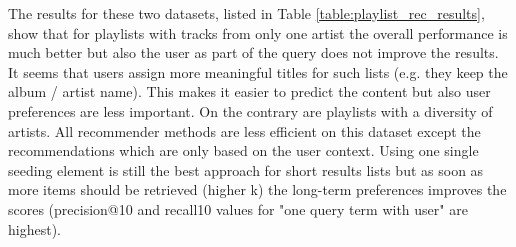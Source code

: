 \documentclass[sigconf]{acmart}
\begin{document}
The results for these two datasets, listed in Table \ref{table:playlist_rec_results}, show that for playlists with tracks from only one artist the overall performance is much better but also the user as part of the query does not improve the results. It seems that users assign more meaningful titles for such lists (e.g. they keep the album / artist name). This makes it easier to predict the content but also user preferences are less important. 
On the contrary are playlists with a diversity of artists. All recommender methods are less efficient on this dataset except the recommendations which are only based on the user context. Using one single seeding element is still the best approach for short results lists but as soon as more items should be retrieved (higher k) the long-term preferences improves the scores (precision@10 and recall10 values for "one query term with user" are highest).
\end{document}
